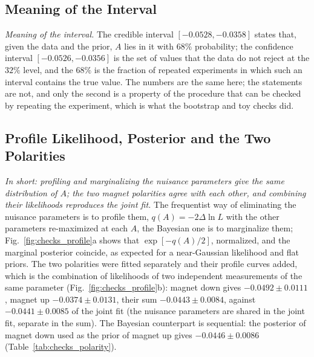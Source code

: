 \subsection{Meaning of the Interval}
\emph{Meaning of the interval.} The credible interval $[-0.0528,-0.0358]$ states that, given the data and the prior, $A$ lies in it with $68\%$ probability; the confidence interval $[-0.0526,-0.0356]$ is the set of values that the data do not reject at the $32\%$ level, and the $68\%$ is the fraction of repeated experiments in which such an interval contains the true value. The numbers are the same here; the statements are not, and only the second is a property of the procedure that can be checked by repeating the experiment, which is what the bootstrap and toy checks did.

\subsection{Profile Likelihood, Posterior and the Two Polarities}
\label{sec:checks_profile}
\emph{In short: profiling and marginalizing the nuisance parameters give the same distribution of $A$; the two magnet polarities agree with each other, and combining their likelihoods reproduces the joint fit.}
The frequentist way of eliminating the nuisance parameters is to profile them, $q(A)=-2\Delta\ln L$ with the other parameters re-maximized at each $A$, the Bayesian one is to marginalize them; Fig.~\ref{fig:checks_profile}a shows that $\exp[-q(A)/2]$, normalized, and the marginal posterior coincide, as expected for a near-Gaussian likelihood and flat priors. The two polarities were fitted separately and their profile curves added, which is the combination of likelihoods of two independent measurements of the same parameter (Fig.~\ref{fig:checks_profile}b): magnet down gives $-0.0492\pm0.0111$, magnet up $-0.0374\pm0.0131$, their sum $-0.0443\pm0.0084$, against $-0.0441\pm0.0085$ of the joint fit (the nuisance parameters are shared in the joint fit, separate in the sum). The Bayesian counterpart is sequential: the posterior of magnet down used as the prior of magnet up gives $-0.0446\pm0.0086$ (Table~\ref{tab:checks_polarity}).


\begin{table}[h]
\centering
{}
\caption{$\Araw$ for the two magnet polarities and their combination, by the two methods; the frequentist combination is the sum of the profile likelihoods of the two polarities, the Bayesian one the sequential update of the posterior.}
\label{tab:checks_polarity}
\end{table}

